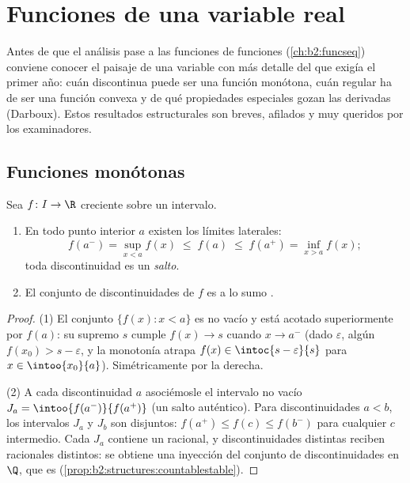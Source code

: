 \chapter{Funciones de una variable real}\label{ch:b2:realfun}

Antes de que el análisis pase a las funciones de funciones
(\cref{ch:b2:funcseq}) conviene conocer el paisaje de una variable con
más detalle del que exigía el primer año: cuán discontinua puede ser
una función monótona, cuán regular ha de ser una función convexa y de
qué propiedades especiales gozan las derivadas (Darboux). Estos
resultados estructurales son breves, afilados y muy queridos por los
examinadores.

\section{Funciones monótonas}

\begin{theorem}\label{thm:b2:realfun:monotone}
Sea $f \colon I \to \R$ creciente sobre un intervalo.
\begin{enumerate}
  \item En todo punto interior $a$ existen los límites laterales:
        \[
        f(a^-) = \sup_{x < a} f(x) \;\leq\; f(a) \;\leq\;
        f(a^+) = \inf_{x > a} f(x) ;
        \]
        toda discontinuidad es un \emph{salto}.
  \item El conjunto de discontinuidades de $f$ es a lo sumo
        .
\end{enumerate}
\end{theorem}

\begin{proof}
(1) El conjunto $\{f(x) : x < a\}$ es no vacío y está acotado
superiormente por $f(a)$: su supremo $s$ cumple $f(x) \to s$ cuando
$x \to a^-$ (dado $\varepsilon$, algún $f(x_0) > s - \varepsilon$, y
la monotonía atrapa $f(x) \in \intoc{s - \varepsilon}{s}$ para $x
\in \intoo{x_0}{a}$). Simétricamente por la derecha.

(2) A cada discontinuidad $a$ asociémosle el intervalo  no
vacío $J_a = \intoo{f(a^-)}{f(a^+)}$ (un salto auténtico). Para
discontinuidades $a < b$, los intervalos $J_a$ y $J_b$ son
disjuntos: $f(a^+) \leq f(c) \leq f(b^-)$ para cualquier $c$
intermedio. Cada $J_a$ contiene un racional, y discontinuidades
distintas reciben racionales distintos: se obtiene una inyección del
conjunto de discontinuidades en $\Q$, que es 
(\cref{prop:b2:structures:countablestable}).
\end{proof}

